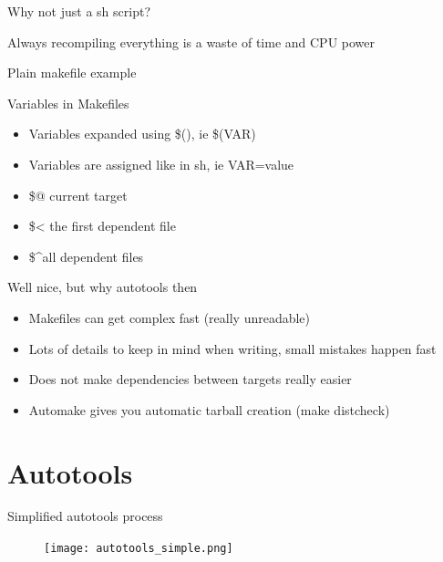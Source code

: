 \documentclass{beamer}
\begin{document}
\begin{frame}{Why not just a sh script?}
	\begin{center}
    \item Always recompiling everything is a waste of time and CPU power
	\end{center}
\end{frame}

\begin{frame}[t]{Plain makefile example}
	\begin{small}
	
	\end{small}
\end{frame}

\begin{frame}{Variables in Makefiles}
    \begin{itemize}
    \item Variables expanded using \$(), ie \$(VAR)
    \item Variables are assigned like in sh, ie VAR=value
    \item \$@ current target
    \item \$< the first dependent file
    \item \$\textasciicircum all dependent files
    \end{itemize}
\end{frame}

\begin{frame}{Well nice, but why autotools then}
    \begin{itemize}
    \item Makefiles can get complex fast (really unreadable)
    \item Lots of details to keep in mind when writing, small mistakes happen fast
    \item Does not make dependencies between targets really easier
    \item Automake gives you automatic tarball creation (make distcheck)
    \end{itemize}
\end{frame}

\section{Autotools}

\begin{frame}{Simplified autotools process}
	\begin{figure}
	\texttt{[image: autotools\_simple.png]}
	\end{figure}
\end{frame}
\end{document}
